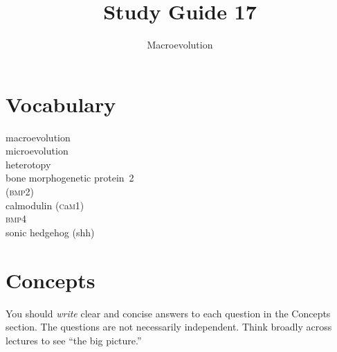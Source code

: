\documentclass[letterpaper]{tufte-handout}
\title{Study Guide 17\hfill}
\author{Macroevolution}
\date{} %
\begin{document}
\maketitle	%

\section{Vocabulary}

\begin{multicols}{2}
macroevolution \\
microevolution \\
heterotopy \\
bone morphogenetic protein\ 2\\\hspace{1em}(\textsc{bmp2})\\
calmodulin (\textsc{c}a\textsc{m1}) \\
\textsc{bmp4}\\
sonic hedgehog (shh)\\

\end{multicols}


\section{Concepts}

You should \emph{write} clear and concise answers to each question in the Concepts section.  The questions are not necessarily independent.  Think broadly across lectures to see ``the big picture.'' 
\end{document}
